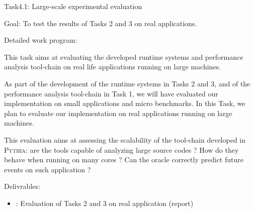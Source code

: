 \documentclass[a4paper,11pt,defblank]{article}
\newcommand{\pname}{\textsc{Pythia}\xspace}
\begin{document}
\begin{paragraph}{Task4.1: Large-scale experimental evaluation}

\begin{paragraph}{Goal:}
To test the results of Tasks 2 and 3 on real applications.
\end{paragraph}

\begin{paragraph}{Detailed work program:}

  This task aims at evaluating the developed runtime systems and
  performance analysis tool-chain on real life applications running on
  large machines.

  As part of the development of the runtime systems in Tasks 2 and 3,
  and of the performance analysis tool-chain in Task 1, we will have
  evaluated our implementation on small applications and micro
  benchmarks. In this Task, we plan to evaluate our implementation on
  real applications running on large machines.

  This evaluation aims at assessing the scalability of the tool-chain
  developed in \pname: are the tools capable of analyzing large source
  codes ? How do they behave when running on many cores ? Can the
  oracle correctly predict future events on such application ?

\end{paragraph}

\begin{paragraph}{Delivrables:}
  \begin{itemize}
  \item[T0+36] [D4.1]: Evaluation of Tasks 2 and 3 on real application (report)
  \end{itemize}
\end{paragraph}

\end{paragraph}
\end{document}
